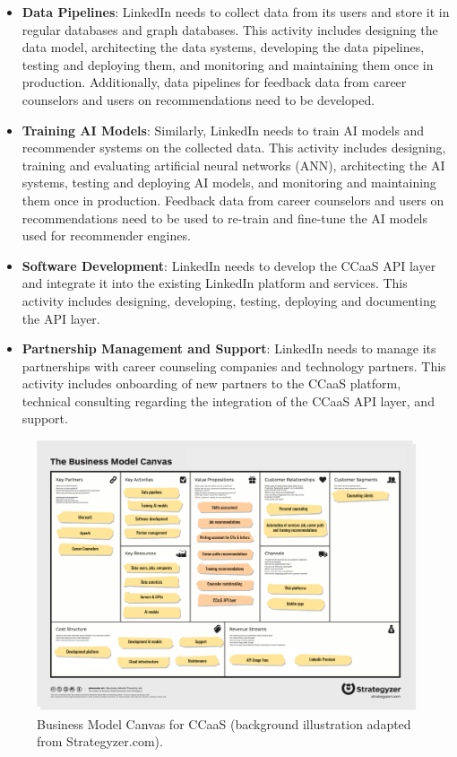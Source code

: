 \begin{itemize}
    \item \textbf{Data Pipelines}: LinkedIn needs to collect data from its users and store it in
            regular databases and graph databases. This activity includes designing the data model,
            architecting the data systems, developing the data pipelines, testing and deploying them,
            and monitoring and maintaining them once in production. Additionally, data pipelines for
            feedback data from career counselors and users on recommendations need to be developed.
    \item \textbf{Training AI Models}: Similarly, LinkedIn needs to train AI models and recommender
            systems on the collected data. This activity includes designing, training and evaluating
            artificial neural networks (ANN), architecting the AI systems, testing and deploying AI models,
            and monitoring and maintaining them once in production. Feedback data from career counselors
            and users on recommendations need to be used to re-train and fine-tune the AI models used 
            for recommender engines.
    \item \textbf{Software Development}: LinkedIn needs to develop the CCaaS API layer and integrate
            it into the existing LinkedIn platform and services. This activity includes designing, developing,
            testing, deploying and documenting the API layer.
    \item \textbf{Partnership Management and Support}: LinkedIn needs to manage its partnerships with
            career counseling companies and technology partners. This activity includes onboarding of
            new partners to the CCaaS platform, technical consulting regarding the integration of the 
            CCaaS API layer, and support.
\end{itemize}

\begin{landscape}
        \begin{figure}
                \centering
                \caption{Business Model Canvas for CCaaS (background illustration adapted from Strategyzer.com).}
                \label{fig:bmc}
                \includegraphics[width=1.3\textwidth]{figures/bmc.pdf}
        \end{figure}
\end{landscape}

